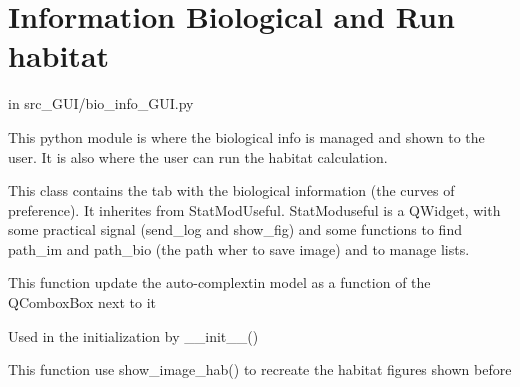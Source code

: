 \documentclass[letterpaper,10pt,english]{sphinxmanual}
\begin{document}
\section{Information Biological and Run habitat}
\label{\detokenize{index:information-biological-and-run-habitat}}
in src\_GUI/bio\_info\_GUI.py

This python module is where the biological info is managed and shown to the user.
It is also where the user can run the habitat calculation.
\label{\detokenize{index:module-src_GUI.bio_info_GUI}}

\begin{fulllineitems}
\label{\detokenize{index:src_GUI.bio_info_GUI.BioInfo}}
This class contains the tab with the biological information (the curves of preference). It inherites from
StatModUseful. StatModuseful is a QWidget, with some practical signal (send\_log and show\_fig) and some functions
to find path\_im and path\_bio (the path wher to save image) and to manage lists.

\begin{fulllineitems}
\label{\detokenize{index:src_GUI.bio_info_GUI.BioInfo.get_autocompletion}}
This function update the auto-complextin model as a function of the QComboxBox next to it

\end{fulllineitems}


\begin{fulllineitems}
\label{\detokenize{index:src_GUI.bio_info_GUI.BioInfo.init_iu}}
Used in the initialization by \_\_init\_\_()

\end{fulllineitems}


\begin{fulllineitems}
\label{\detokenize{index:src_GUI.bio_info_GUI.BioInfo.recreate_fig}}
This function use show\_image\_hab() to recreate the habitat figures shown before


\end{fulllineitems}
\end{fulllineitems}
\end{document}
